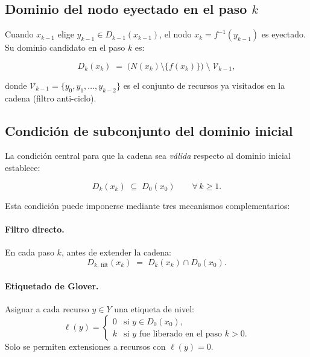 \documentclass[12pt, a4paper]{article}
\theoremstyle{definition}
\theoremstyle{plain}
\theoremstyle{remark}
\newcommand{\domk}[2]{D_{#1}\!\left(#2\right)}
\newcommand{\inv}[1]{f^{-1}\!\left(#1\right)}
\newcommand{\Nset}[1]{N\!\left(#1\right)}
\begin{document}
\subsection{Dominio del nodo eyectado en el paso \texorpdfstring{$k$}{k}}

Cuando $x_{k-1}$ elige $y_{k-1} \in \domk{k-1}{x_{k-1}}$, el nodo
$x_k = \inv{y_{k-1}}$ es eyectado.  Su dominio candidato en el paso $k$ es:

\begin{equation}
  \domk{k}{x_k} \;=\;
  \bigl(\Nset{x_k} \setminus \{f(x_k)\}\bigr)
  \;\setminus\;
  \mathcal{V}_{k-1},
  \label{eq:domk}
\end{equation}

donde $\mathcal{V}_{k-1} = \{y_0, y_1, \ldots, y_{k-2}\}$ es el conjunto de
recursos ya visitados en la cadena (filtro anti-ciclo).

\subsection{Condición de subconjunto del dominio inicial}

La condición central para que la cadena sea \emph{válida} respecto al dominio
inicial establece:

\begin{equation}
  \boxed{\domk{k}{x_k} \;\subseteq\; \domk{0}{x_0}}
  \qquad \forall\, k \geq 1.
  \label{eq:subset}
\end{equation}

Esta condición puede imponerse mediante tres mecanismos complementarios:

\paragraph{Filtro directo.} En cada paso $k$, antes de extender la cadena:
\[
  \domk{k,\,\text{filt}}{x_k}
  \;=\;
  \domk{k}{x_k} \cap \domk{0}{x_0}.
\]

\paragraph{Etiquetado de Glover.} Asignar a cada recurso $y \in Y$ una etiqueta
de nivel:
\[
  \ell(y) =
  \begin{cases}
    0 & \text{si } y \in \domk{0}{x_0}, \\
    k & \text{si } y \text{ fue liberado en el paso } k > 0.
  \end{cases}
\]
Solo se permiten extensiones a recursos con $\ell(y) = 0$.
\end{document}
